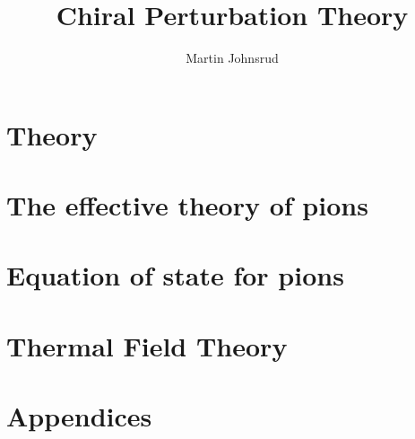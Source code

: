 \documentclass{book}
\title{Chiral Perturbation Theory}
\author{Martin Johnsrud}
\begin{document}
\maketitle 

\tableofcontents

\chapter{Theory}







\chapter{The effective theory of pions}
\label{serction:effective_pion_lagrangian}








\chapter{Equation of state for pions}



\chapter{Thermal Field Theory}
\label{section:thermal field theory}







\appendix
\chapter{Appendices}





\end{document}
